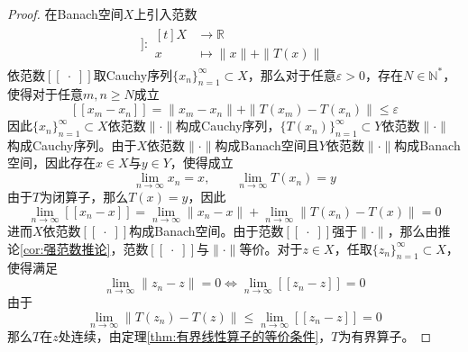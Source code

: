 \documentclass[lang = cn, scheme = chinese, thmcnt = section]{elegantbook}
\newcommand{\N}{\mathbb{N}}            %
\newcommand{\R}{\mathbb{R}}            %
\newcommand{\sub}{\subset}             %
\begin{document}
\begin{proof}
	在Banach空间$X$上引入范数
	\begin{align*}
		[\![\;\cdot\;]\!]:\begin{aligned}[t]
			X&\longrightarrow\R\\
			x&\longmapsto \|x\|+\|T(x)\|
		\end{aligned}
	\end{align*}
	依范数$[\![\;\cdot\;]\!]$取Cauchy序列$\{x_n\}_{n=1}^{\infty}\sub X$，那么对于任意$\varepsilon>0$，存在$N\in\N^*$，使得对于任意$m,n\ge N$成立
	$$
	[\![x_m-x_n]\!]=\|x_m-x_n\|+\|T(x_m)-T(x_n)\|\le\varepsilon
	$$
	因此$\{x_n\}_{n=1}^{\infty}\sub X$依范数$\|\cdot\|$构成Cauchy序列，$\{T(x_n)\}_{n=1}^{\infty}\sub Y$依范数$\|\cdot\|$构成Cauchy序列。由于$X$依范数$\|\cdot\|$构成Banach空间且$Y$依范数$\|\cdot\|$构成Banach空间，因此存在$x\in X$与$y\in Y$，使得成立
	$$
	\lim_{n\to\infty}x_n=x,\qquad 
	\lim_{n\to\infty}T(x_n)=y
	$$
	由于$T$为闭算子，那么$T(x)=y$，因此
	$$
	\lim_{n\to\infty}[\![x_n-x]\!]=\lim_{n\to\infty}\|x_n-x\|+\lim_{n\to\infty}\|T(x_n)-T(x)\|=0
	$$
	进而$X$依范数$[\![\;\cdot\;]\!]$构成Banach空间。由于范数$[\![\;\cdot\;]\!]$强于$\|\cdot\|$，那么由推论\ref{cor:强范数推论}，范数$[\![\;\cdot\;]\!]$与$\|\cdot\|$等价。对于$z\in X$，任取$\{z_n\}_{n=1}^{\infty}\sub X$，使得满足
	$$
	\lim_{n\to\infty}\|z_n-z\|=0\iff \lim_{n\to\infty}[\![z_n-z]\!]=0
	$$
	由于
	$$
	\lim_{n\to\infty}\|T(z_n)-T(z)\|\le \lim_{n\to\infty}[\![z_n-z]\!]=0
	$$
	那么$T$在$z$处连续，由定理\ref{thm:有界线性算子的等价条件}，$T$为有界算子。
\end{proof}
\end{document}
